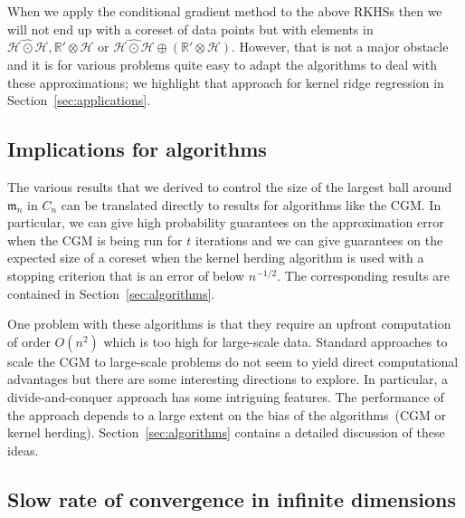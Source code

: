 \documentclass[10pt]{amsart}
\theoremstyle{definition}\newtheorem{defi}[theo]{Definition}\newtheorem{rema}[theo]{Remark}\newtheorem{exam}[theo]{Example}\newtheorem{exem}[theo]{Example}\newtheorem{nota}[theo]{Notation}
\theoremstyle{remark}
\newcommand{\R}{\mathbb{R}}
\newcommand{\dR}{{\R'}}
\newcommand{\cH}{\mathcal{H}}
\newcommand{\mean}{\mathfrak{m}}
\begin{document}
When we apply the conditional gradient method to the above RKHSs then we will not end up with a coreset of data points but with elements in $\widehat{\cH \odot \cH}, \dR \otimes \cH$ or $\widehat{\cH \odot \cH} \oplus (\dR \otimes \cH)$. However, that is not a major obstacle and it is for various problems quite easy to adapt the algorithms to deal with these approximations; we highlight that approach for kernel ridge regression in Section~\ref{sec:applications}.



\subsection{Implications for algorithms}

The various results that we derived to control the size of the largest ball around $\mean_n$ in $C_n$ can be translated directly to results for algorithms like the CGM. In particular, we can give high probability guarantees on the approximation error when the CGM is being run for $t$ iterations and we can give guarantees on the expected size of a coreset when the kernel herding algorithm is used with a stopping criterion that is an error of below $n^{-1/2}$. The corresponding results are contained in Section~\ref{sec:algorithms}.



One problem with these algorithms is that they require an upfront computation of order $O(n^2)$ which is too high for large-scale data. Standard approaches to scale the CGM to large-scale problems do not seem to yield direct computational advantages but there are some interesting directions to explore. In particular, a divide-and-conquer approach has some intriguing features. The performance of the approach depends to a large extent on the bias of the algorithms~(CGM or kernel herding). Section~\ref{sec:algorithms} contains a detailed discussion of these ideas.



\subsection{Slow rate of convergence in infinite dimensions}
\end{document}
